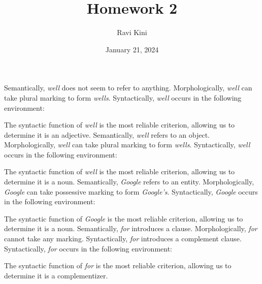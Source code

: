 \documentclass{article}
\title{Homework 2}
\author{Ravi Kini}
\date{January 21, 2024}
\begin{document}
\maketitle

Semantically, \textit{well} does not seem to refer to anything. Morphologically, \textit{well} can take plural marking to form \textit{wells}. Syntactically, \textit{well} occurs in the following environment:
\begin{exe}
\end{exe}
The syntactic function of \textit{well} is the most reliable criterion, allowing us to determine it is an adjective.
Semantically, \textit{well} refers to an object. Morphologically, \textit{well} can take plural marking to form \textit{wells}. Syntactically, \textit{well} occurs in the following environment:
\begin{exe}
\end{exe}
The syntactic function of \textit{well} is the most reliable criterion, allowing us to determine it is a noun.
Semantically, \textit{Google} refers to an entity. Morphologically, \textit{Google} can take possessive marking to form \textit{Google's}. Syntactically, \textit{Google} occurs in the following environment:
\begin{exe}
\end{exe}
The syntactic function of \textit{Google} is the most reliable criterion, allowing us to determine it is a noun.
Semantically, \textit{for} introduces a clause. Morphologically, \textit{for} cannot take any marking. Syntactically, \textit{for} introduces a complement clause. Syntactically, \textit{for} occurs in the following environment:
\begin{exe}
\end{exe}
The syntactic function of \textit{for} is the most reliable criterion, allowing us to determine it is a complementizer.
\clearpage
\end{document}
